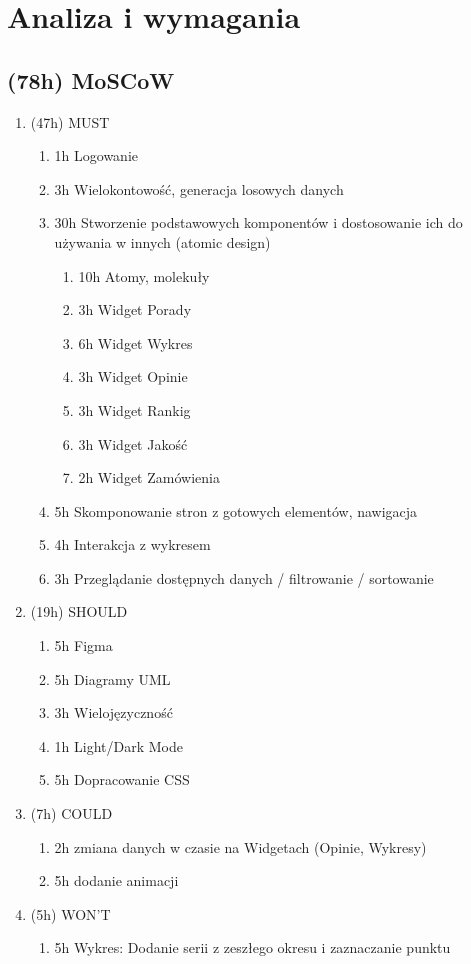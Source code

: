 \documentclass[a4paper,11pt]{article}
\begin{document}
\maketitle

\section{Analiza i wymagania}
\subsection{(78h) MoSCoW}


\begin{enumerate}
    \item (47h) MUST
    \begin{enumerate}
        \item 1h Logowanie
        \item 3h Wielokontowość, generacja losowych danych
        \item 30h Stworzenie podstawowych komponentów i dostosowanie ich do używania w innych (atomic design) 
        \begin{enumerate}
            \item 10h Atomy, molekuły
            \item 3h Widget Porady
            \item 6h Widget Wykres
            \item 3h Widget Opinie
            \item 3h Widget Rankig
            \item 3h Widget Jakość
            \item 2h Widget Zamówienia
        \end{enumerate}
        \item 5h Skomponowanie stron z gotowych elementów, nawigacja
        \item 4h Interakcja z wykresem
        \item 3h Przeglądanie dostępnych danych / filtrowanie / sortowanie
    \end{enumerate}
    \item (19h) SHOULD
    \begin{enumerate}
        \item 5h Figma
        \item 5h Diagramy UML
        \item 3h Wielojęzyczność
        \item 1h Light/Dark Mode
        \item 5h Dopracowanie CSS
    \end{enumerate}
    \item (7h) COULD
    \begin{enumerate}
        \item 2h zmiana danych w czasie na Widgetach (Opinie, Wykresy)
        \item 5h dodanie animacji
    \end{enumerate}
    \item (5h) WON'T
    \begin{enumerate}
        \item 5h Wykres: Dodanie serii z zeszłego okresu i zaznaczanie punktu
        

\end{enumerate}
\end{enumerate}
\end{document}
